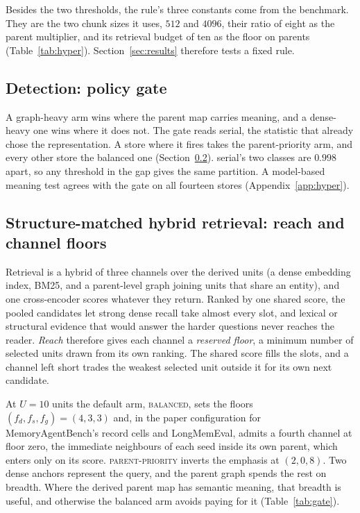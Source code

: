 \documentclass{article}
\newcommand{\serial}{\textsf{serial}}
\newcommand{\balanced}{\textsc{balanced}}
\newcommand{\parprio}{\textsc{parent-priority}}
\begin{document}
Besides the two thresholds, the rule's three constants come from the benchmark. They are the two chunk sizes it uses, $512$ and $4096$, their ratio of eight as the parent multiplier, and its retrieval budget of ten as the floor on parents (Table~\ref{tab:hyper}). Section~\ref{sec:results} therefore tests a fixed rule.

\subsection{Detection: policy gate}\label{sec:gate}

A graph-heavy arm wins where the parent map
carries meaning, and a dense-heavy one wins where it does not. The gate reads \serial{}, the statistic that
already chose the representation. A store where it fires takes the parent-priority arm, and every other store
the balanced one (Section~\ref{sec:read}). \serial{}'s two classes are $0.998$ apart, so any threshold in the gap gives the same partition. A model-based meaning test agrees with the gate on all fourteen stores (Appendix~\ref{app:hyper}).

\subsection{Structure-matched hybrid retrieval: reach and channel floors}\label{sec:read}

Retrieval is a hybrid of three channels over the derived units (a dense embedding index, BM25, and a parent-level graph joining
units that share an entity), and one cross-encoder scores whatever they
return. Ranked by one shared score, the pooled candidates
let strong dense recall take almost every slot, and lexical or structural evidence that would answer the
harder questions never reaches the reader. \emph{Reach} therefore gives each channel a \emph{reserved floor}, a minimum number of selected units drawn from its own ranking. The shared score fills the slots, and a channel left short trades the weakest selected unit outside it for its own next candidate.

At $U{=}10$ units the default arm, \balanced{}, sets the floors $(f_d,f_s,f_g)=(4,3,3)$ and, in the paper configuration for MemoryAgentBench's record cells and LongMemEval, admits a fourth channel at floor zero, the immediate neighbours of each seed inside its own parent, which enters only on its score. \parprio{} inverts the emphasis at $(2,0,8)$. Two dense anchors represent the query, and the parent graph spends the rest on breadth. Where the derived parent map has semantic meaning, that breadth is useful, and otherwise the balanced arm avoids paying for it (Table~\ref{tab:gate}).
\end{document}
